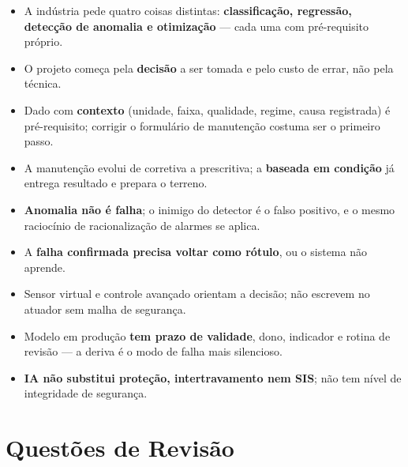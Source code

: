 \begin{itemize}
\tightlist
\item
  A indústria pede quatro coisas distintas: \textbf{classificação, regressão, detecção de anomalia e otimização} --- cada uma com pré-requisito próprio.
\item
  O projeto começa pela \textbf{decisão} a ser tomada e pelo custo de errar, não pela técnica.
\item
  Dado com \textbf{contexto} (unidade, faixa, qualidade, regime, causa registrada) é pré-requisito; corrigir o formulário de manutenção costuma ser o primeiro passo.
\item
  A manutenção evolui de corretiva a prescritiva; a \textbf{baseada em condição} já entrega resultado e prepara o terreno.
\item
  \textbf{Anomalia não é falha}; o inimigo do detector é o falso positivo, e o mesmo raciocínio de racionalização de alarmes se aplica.
\item
  A \textbf{falha confirmada precisa voltar como rótulo}, ou o sistema não aprende.
\item
  Sensor virtual e controle avançado orientam a decisão; não escrevem no atuador sem malha de segurança.
\item
  Modelo em produção \textbf{tem prazo de validade}, dono, indicador e rotina de revisão --- a deriva é o modo de falha mais silencioso.
\item
  \textbf{IA não substitui proteção, intertravamento nem SIS}; não tem nível de integridade de segurança.
\end{itemize}

\section{Questões de Revisão}\label{questuxf5es-de-revisuxe3o}

